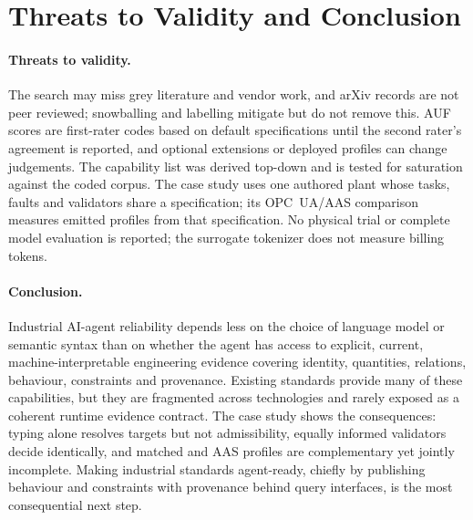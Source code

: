 \section{Threats to Validity and Conclusion}
\label{sec:conclusion}

\paragraph{Threats to validity.} The search may miss grey literature and vendor work, and
arXiv records are not peer reviewed; snowballing and labelling mitigate but do not remove
this. AUF scores are first-rater codes based on default specifications until the second
rater's agreement is reported, and optional extensions or deployed profiles can change
judgements. The capability list was derived top-down and is tested for saturation against
the coded corpus. The case study uses one authored plant whose tasks, faults and
validators share a specification; its OPC~UA/AAS comparison measures emitted profiles from
that specification. No physical trial or complete model evaluation is reported; the
surrogate tokenizer does not measure billing tokens.

\paragraph{Conclusion.} Industrial AI-agent reliability depends less on the choice of
language model or semantic syntax than on whether the agent has access to explicit,
current, machine-interpretable engineering evidence covering identity, quantities,
relations, behaviour, constraints and provenance. Existing standards provide many of
these capabilities, but they are fragmented across technologies and rarely exposed as a
coherent runtime evidence contract. The case study shows the consequences: typing alone
resolves targets but not admissibility, equally informed validators decide identically,
and matched \opcua{} and AAS profiles are complementary yet jointly incomplete. Making
industrial standards agent-ready, chiefly by publishing behaviour and constraints with
provenance behind query interfaces, is the most consequential next step.
